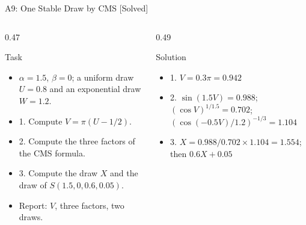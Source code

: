 \begin{frame}{A9: One Stable Draw by CMS [Solved]}
\itemsize{\footnotesize}
\begin{columns}[T]
\begin{column}{0.47\textwidth}
\begin{block}{Task}
\begin{itemize}
    \item $\alpha = 1.5$, $\beta = 0$; a uniform draw $U = 0.8$ and an exponential draw $W = 1.2$.
    \item 1. Compute $V = \pi(U - 1/2)$.
    \item 2. Compute the three factors of the CMS formula.
    \item 3. Compute the draw $X$ and the draw of $S(1.5, 0, 0.6, 0.05)$.
    \item Report: $V$, three factors, two draws.
\end{itemize}
\end{block}
\end{column}
\begin{column}{0.49\textwidth}
\begin{exampleblock}{Solution}
\begin{itemize}
    \item 1. $V = 0.3\pi = 0.942$
    \item 2. $\sin(1.5V) = 0.988$; $(\cos V)^{1/1.5} = 0.702$; $(\cos(-0.5V)/1.2)^{-1/3} = 1.104$
    \item 3. $X = 0.988/0.702 \times 1.104 = 1.554$; then $0.6X + 0.05$
\end{itemize}
\end{exampleblock}
\end{column}
\end{columns}
\end{frame}

